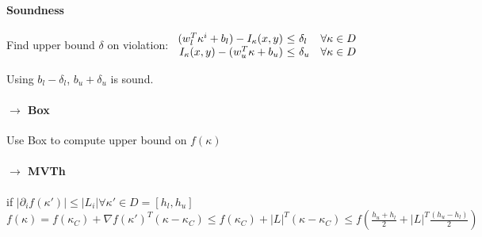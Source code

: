 \paragraph{Soundness}
Find upper bound $\delta$ on violation: 
$\begin{array}{r@{~\le~}ll}
(w_l^T\kappa^i + b_l) - I_\kappa(x, y) & \delta_l &\forall \kappa \in D \\
 I_\kappa(x, y) - (w_u^T\kappa + b_u) & \delta_u &\forall \kappa \in D
\end{array}$

Using $b_l-\delta_l$, $b_u+\delta_u$ is sound. 

\paragraph{$\rightarrow$ Box}
Use Box to compute upper bound on $f(\kappa)$

\paragraph{$\rightarrow$ MVTh} if $\lvert \partial_i f(\kappa') \rvert \le \lvert L_i \rvert \forall \kappa' \in D = [h_l, h_u]$
$f(\kappa) = f(\kappa_C) + \nabla f(\kappa')^T(\kappa-\kappa_C) \le f(\kappa_C) + \lvert L \rvert^T (\kappa - \kappa_C) \le f\left(\frac{h_u+h_l}{2} + \lvert L \rvert^T \frac{(h_u-h_l)}{2}\right)$
